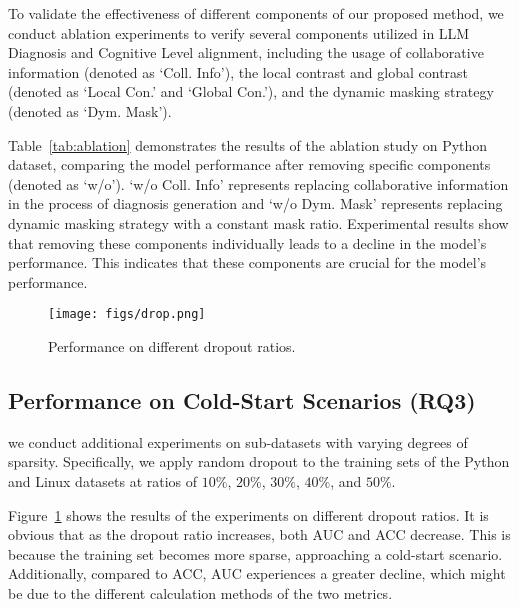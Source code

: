 To validate the effectiveness of different components of our proposed method, we conduct ablation experiments to verify several components utilized in LLM Diagnosis and Cognitive Level alignment, including the usage of collaborative information (denoted as `Coll. Info'), the local contrast and global contrast (denoted as `Local Con.' and `Global Con.'), and the dynamic masking strategy (denoted as `Dym. Mask').

Table~\ref{tab:ablation} demonstrates the results of the ablation study on Python dataset, comparing the model performance after removing specific components (denoted as `w/o'). `w/o Coll. Info' represents replacing collaborative information in the process of diagnosis generation and `w/o Dym. Mask' represents replacing dynamic masking strategy with a constant mask ratio.
Experimental results show that removing these components individually leads to a decline in the model's performance. This indicates that these components are crucial for the model's performance.


\begin{figure}[t]
  \centering
  
  \texttt{[image: figs/drop.png]}
  \caption{Performance on different dropout ratios.}
  
\label{fig: drop}
\end{figure}
\subsection{Performance on Cold-Start Scenarios (RQ3)}

we conduct additional experiments on sub-datasets with varying degrees of sparsity. Specifically, we apply random dropout to the training sets of the Python and Linux datasets at ratios of $10\%$, $20\%$, $30\%$, $40\%$, and $50\%$.

Figure~\ref{fig: drop} shows the results of the experiments on different dropout ratios. It is obvious that as the dropout ratio increases, both AUC and ACC decrease. This is because the training set becomes more sparse, approaching a cold-start scenario. 
Additionally, compared to ACC, AUC experiences a greater decline, which might be due to the different calculation methods of the two metrics. 


